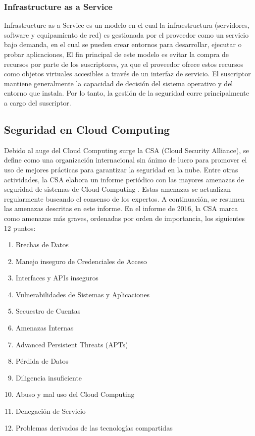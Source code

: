 \subsubsection{Infrastructure as a Service}

Infrastructure as a Service es un modelo en el cual la infraestructura (servidores, software y equipamiento de red) es gestionada por el proveedor como un servicio bajo demanda, en el cual se pueden crear entornos para desarrollar, ejecutar o probar aplicaciones, El fin principal de este modelo es evitar la compra de recursos por parte de los suscriptores, ya que el proveedor ofrece estos recursos como objetos virtuales accesibles a través de un interfaz de servicio. El suscriptor mantiene generalmente la capacidad de decisión del sistema operativo y del entorno que instala. Por lo tanto, la gestión de la seguridad corre principalmente a cargo del suscriptor.

\subsection{Seguridad en Cloud Computing}

Debido al auge del Cloud Computing surge la CSA (Cloud Security Alliance), se define como una organización internacional sin ánimo de lucro para promover el uso de mejores prácticas para garantizar la seguridad en la nube.
Entre otras actividades, la CSA elabora un informe periódico con las mayores amenazas de seguridad de sistemas de Cloud Computing \cite{csa-cloud-12-threats}. Estas amenazas se actualizan regularmente buscando el consenso de los expertos. A continuación, se resumen las amenazas descritas en este informe. En el informe de 2016, la CSA marca como amenazas más graves, ordenadas por orden de importancia, los siguientes 12 puntos:
\begin{enumerate}
	\item Brechas de Datos
	\item Manejo inseguro de Credenciales de Acceso
	\item Interfaces y APIs inseguros
	\item Vulnerabilidades de Sistemas y Aplicaciones
	\item Secuestro de Cuentas
	\item Amenazas Internas
	\item Advanced Persistent Threats (APTs)
	\item Pérdida de Datos
	\item Diligencia insuficiente
	\item Abuso y mal uso del Cloud Computing
	\item Denegación de Servicio
	\item Problemas derivados de las tecnologías compartidas
\end{enumerate}

